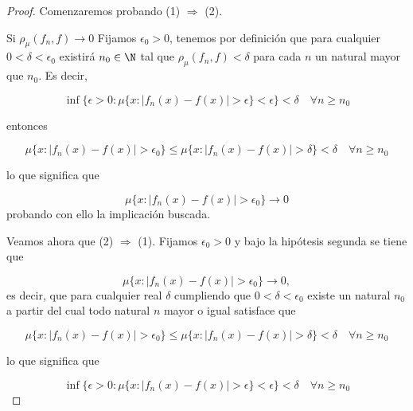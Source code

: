 \begin{proof}
    Comenzaremos probando (1) $\Rightarrow$ (2). 

    Si $\rho_{\mu}(f_n, f) \longrightarrow 0$
    Fijamos $\epsilon_0 > 0$, tenemos por definición que 
    para cualquier $0 < \delta < \epsilon_0$ existirá $n_0 \in \N$ tal que 
    $\rho_{\mu}(f_n, f) < \delta$ para cada $n$ un natural mayor que $n_0$. Es decir,  
    

    $$\inf \{ \epsilon > 0: \mu \{ x : |f_n(x) - f(x)| > \epsilon \} < \epsilon \} < \delta \quad \forall n \geq n_0$$

    entonces 

    \begin{equation}
        \mu \{ x : |f_n(x) - f(x)| > \epsilon_0 \}
        \leq
        \mu \{ x : |f_n(x) - f(x)| > \delta\}
        < \delta 
        \quad 
        \forall n \geq n_0
    \end{equation}

    lo que significa que 

    \begin{equation}
        \mu \{ x : |f_n(x) - f(x)| > \epsilon_0 \}
        \longrightarrow
        0  
    \end{equation}
    probando con ello la implicación buscada.

    Veamos ahora que (2) $\Rightarrow$ (1). 
    Fijamos $\epsilon_0 > 0$ y bajo la hipótesis segunda se tiene que 

    \begin{equation}
        \mu \{ x : |f_n(x) - f(x)| > \epsilon_0 \}
        \longrightarrow
        0,  
    \end{equation}
    es decir, que para cualquier real $\delta$ cumpliendo que $0 < \delta < \epsilon_0$ 
    existe un natural $n_0$ a partir del cual todo natural $n$ mayor o igual satisface que 
    
    \begin{equation}
        \mu \{ x : |f_n(x) - f(x)| > \epsilon_0 \}
        \leq
        \mu \{ x : |f_n(x) - f(x)| > \delta\}
        < \delta 
        \quad 
        \forall n \geq n_0
    \end{equation}

    lo que significa que 
    
    \begin{equation}
        \inf \{ \epsilon > 0:
         \mu \{ 
             x : |f_n(x) - f(x)| > \epsilon \} < \epsilon 
             \} 
        < \delta 
        \quad 
        \forall n \geq n_0
    \end{equation}


\end{proof}
